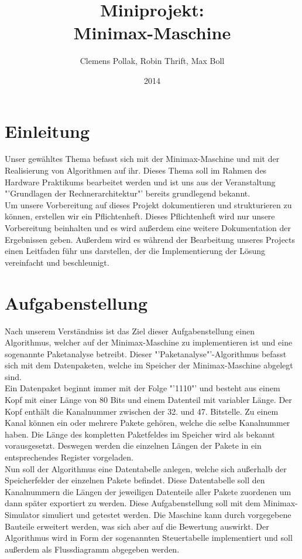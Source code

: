 \documentclass[12pt,titlepage]{article}
\begin{document}
\title{Miniprojekt: \\ Minimax-Maschine}
\author{Clemens Pollak, Robin Thrift, Max Boll}
\date{2014}
\maketitle

\tableofcontents


\section{Einleitung} 
Unser gew{\"a}hltes Thema befasst sich mit der Minimax-Maschine und mit der Realisierung von Algorithmen auf ihr. Dieses Thema soll im Rahmen des Hardware Praktikums bearbeitet werden und ist uns aus der Veranstaltung "'Grundlagen der Rechnerarchitektur"' bereits grundlegend bekannt.\\ Um unsere Vorbereitung auf dieses Projekt dokumentieren und strukturieren zu k{\"o}nnen, erstellen wir ein Pflichtenheft. Dieses Pflichtenheft wird nur unsere Vorbereitung beinhalten und es wird au{\ss}erdem eine weitere Dokumentation der Ergebnissen geben. Außerdem wird es w{\"a}hrend der Bearbeitung unseres Projects einen Leitfaden führ uns darstellen, der die Implementierung der L{\"o}sung vereinfacht und beschleunigt.

\section{Aufgabenstellung}
Nach unserem Verst{\"a}ndniss ist das Ziel dieser Aufgabenstellung einen Algorithmus, welcher auf der Minimax-Maschine zu implementieren ist und eine sogenannte Paketanalyse betreibt. Dieser "'Paketanalyse"'-Algorithmus befasst sich mit dem Datenpaketen, welche im Speicher der Minimax-Maschine abgelegt sind.\\ Ein Datenpaket beginnt immer mit der Folge "'1110"' und besteht aus einem
Kopf mit einer L{\"a}nge von 80 Bits und einem Datenteil mit variabler L{\"a}nge. Der Kopf enth{\"a}lt die Kanalnummer zwischen der 32. und 47. Bitstelle. Zu einem Kanal k{\"o}nnen ein oder mehrere Pakete geh{\"o}ren, welche die selbe Kanalnummer haben.
Die L{\"a}nge des kompletten Paketfeldes im Speicher wird als bekannt vorausgesetzt. Deswegen werden die einzelnen L{\"a}ngen der Pakete in ein entsprechendes Register vorgeladen.\\
Nun soll der Algorithmus eine Datentabelle anlegen, welche sich au{\ss}erhalb der Speicherfelder der einzelnen Pakete befindet. Diese Datentabelle soll den Kanalnummern die L{\"a}ngen der jeweiligen Datenteile aller Pakete zuordenen um dann später exportiert zu werden. Diese Aufgabenstellung soll mit dem Minimax-Simulator simuliert und getestet werden. Die Maschine kann durch vorgegebene Bauteile erweitert werden, was sich aber auf die Bewertung auswirkt. Der Algorithmus wird in Form der sogenannten Steuertabelle implementiert und soll außerdem als Flussdiagramm abgegeben werden.
\end{document}
